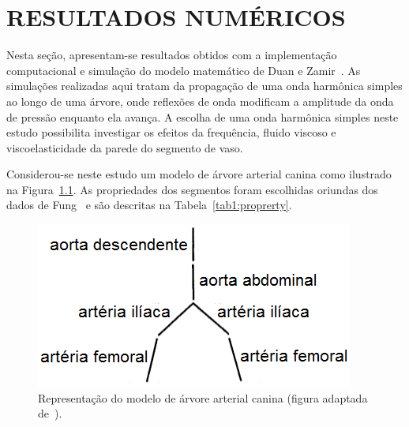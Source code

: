 \chapter{RESULTADOS NUMÉRICOS}\label{sec:resultados}


Nesta seção, apresentam-se resultados obtidos com a implementação computacional e simulação do modelo matemático de Duan e Zamir~\cite{Duan1992}. As simulações realizadas aqui tratam da propagação de uma onda harmônica simples ao longo de uma árvore, onde reflexões de onda modificam a amplitude da onda de pressão enquanto ela avança. A escolha de uma onda harmônica simples neste estudo possibilita investigar os efeitos da frequência, fluido viscoso e viscoelasticidade da parede do segmento de vaso.

Considerou-se neste estudo um modelo de árvore arterial canina como ilustrado na Figura~\ref{fig:arvore-canina}. As propriedades dos segmentos foram escolhidas oriundas dos dados de Fung~\cite{fung2013biomechanics} e são descritas na Tabela~\ref{tab1:proprerty}. 

\begin{figure}[!htbp]
	\centering
	\includegraphics[scale=0.8]{Figures/tree_canine.png}
	\caption{Representação do modelo de árvore arterial canina (figura adaptada de~\cite{Duan}).}
	\label{fig:arvore-canina}
\end{figure}

